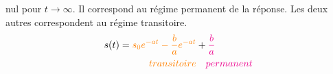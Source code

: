 nul pour $t\to\infty$. Il correspond au régime permanent de
la réponse. Les deux autres correspondent au régime transitoire.
\begin{align*}
    s(t)=\textcolor{orange}{s_0e^{-at}-\dfrac{b}{a}e^{-at}}&+
    \textcolor{magenta}{\dfrac{b}{a}}\\
    \textcolor{orange}{transitoire} &\quad\textcolor{magenta}{permanent}
\end{align*}
